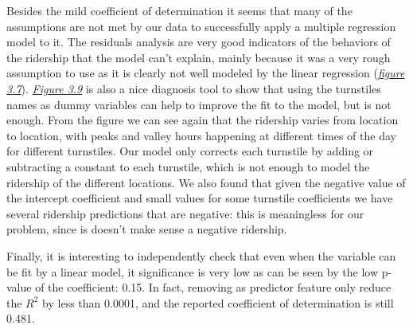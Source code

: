 \documentclass[a4paper,12pt,english]{sphinxmanual}
\begin{document}
Besides the mild coefficient of determination it seems that many of the
assumptions are not met by our data to successfully apply a multiple regression
model to it. The residuals analysis are very good indicators of the behaviors of
the ridership that the model can't explain, mainly because it was a very rough
assumption to use  as it is clearly not well modeled by the linear
regression ({\hyperref[section2:figure37]{\emph{figure 3.7}}}). {\hyperref[section2:figure39]{\emph{Figure 3.9}}} is also
a nice diagnosis tool to show that using the turnstiles names as dummy variables
can help to improve the fit to the model, but is not enough. From the figure we
can see again that the ridership varies from location to location, with peaks
and valley hours happening at different times of the day for different
turnstiles. Our model only corrects each turnstile by adding or subtracting a
constant to each turnstile, which is not enough to model the ridership of the
different locations. We also found that given the negative value of the
intercept coefficient and small values for some turnstile coefficients we have
several ridership predictions that are negative: this is meaningless for our
problem, since is doesn't make sense a negative ridership.

Finally, it is interesting to independently check that even when the 
variable can be fit by a linear model, it significance is very low as can be
seen by the low p-value of the coefficient: 0.15. In fact, removing  as
predictor feature only reduce the \(R^2\) by less than 0.0001, and the
reported coefficient of determination is still 0.481.
\end{document}
